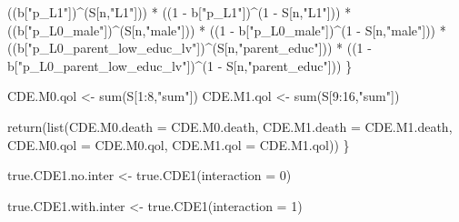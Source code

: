 \documentclass[
]{book}
\newenvironment{Shaded}{\begin{snugshade}}{\end{snugshade}}
\newcommand{\AttributeTok}[1]{\textcolor[rgb]{0.77,0.63,0.00}{#1}}
\newcommand{\DecValTok}[1]{\textcolor[rgb]{0.00,0.00,0.81}{#1}}
\newcommand{\FunctionTok}[1]{\textcolor[rgb]{0.00,0.00,0.00}{#1}}
\newcommand{\NormalTok}[1]{#1}
\newcommand{\OtherTok}[1]{\textcolor[rgb]{0.56,0.35,0.01}{#1}}
\newcommand{\SpecialCharTok}[1]{\textcolor[rgb]{0.00,0.00,0.00}{#1}}
\newcommand{\StringTok}[1]{\textcolor[rgb]{0.31,0.60,0.02}{#1}}
\begin{document}
\begin{Shaded}
\begin{Highlighting}[]
\NormalTok{      ((b[}\StringTok{"p\_L1"}\NormalTok{])}\SpecialCharTok{\^{}}\NormalTok{(S[n,}\StringTok{"L1"}\NormalTok{])) }\SpecialCharTok{*}
\NormalTok{      ((}\DecValTok{1} \SpecialCharTok{{-}}\NormalTok{ b[}\StringTok{"p\_L1"}\NormalTok{])}\SpecialCharTok{\^{}}\NormalTok{(}\DecValTok{1} \SpecialCharTok{{-}}\NormalTok{ S[n,}\StringTok{"L1"}\NormalTok{])) }\SpecialCharTok{*}
\NormalTok{      ((b[}\StringTok{"p\_L0\_male"}\NormalTok{])}\SpecialCharTok{\^{}}\NormalTok{(S[n,}\StringTok{"male"}\NormalTok{])) }\SpecialCharTok{*} 
\NormalTok{      ((}\DecValTok{1} \SpecialCharTok{{-}}\NormalTok{ b[}\StringTok{"p\_L0\_male"}\NormalTok{])}\SpecialCharTok{\^{}}\NormalTok{(}\DecValTok{1} \SpecialCharTok{{-}}\NormalTok{ S[n,}\StringTok{"male"}\NormalTok{])) }\SpecialCharTok{*} 
\NormalTok{      ((b[}\StringTok{"p\_L0\_parent\_low\_educ\_lv"}\NormalTok{])}\SpecialCharTok{\^{}}\NormalTok{(S[n,}\StringTok{"parent\_educ"}\NormalTok{])) }\SpecialCharTok{*}
\NormalTok{      ((}\DecValTok{1} \SpecialCharTok{{-}}\NormalTok{ b[}\StringTok{"p\_L0\_parent\_low\_educ\_lv"}\NormalTok{])}\SpecialCharTok{\^{}}\NormalTok{(}\DecValTok{1} \SpecialCharTok{{-}}\NormalTok{ S[n,}\StringTok{"parent\_educ"}\NormalTok{])) }
\NormalTok{    \}}
  
\NormalTok{  CDE.M0.qol }\OtherTok{\textless{}{-}} \FunctionTok{sum}\NormalTok{(S[}\DecValTok{1}\SpecialCharTok{:}\DecValTok{8}\NormalTok{,}\StringTok{"sum"}\NormalTok{])}
\NormalTok{  CDE.M1.qol }\OtherTok{\textless{}{-}} \FunctionTok{sum}\NormalTok{(S[}\DecValTok{9}\SpecialCharTok{:}\DecValTok{16}\NormalTok{,}\StringTok{"sum"}\NormalTok{])}
  
  \FunctionTok{return}\NormalTok{(}\FunctionTok{list}\NormalTok{(}\AttributeTok{CDE.M0.death =}\NormalTok{ CDE.M0.death, }\AttributeTok{CDE.M1.death =}\NormalTok{ CDE.M1.death, }
              \AttributeTok{CDE.M0.qol =}\NormalTok{ CDE.M0.qol, }\AttributeTok{CDE.M1.qol =}\NormalTok{ CDE.M1.qol))}
\NormalTok{\}}
\end{Highlighting}
\end{Shaded}

\begin{Shaded}
\begin{Highlighting}[]
\NormalTok{true.CDE1.no.inter }\OtherTok{\textless{}{-}} \FunctionTok{true.CDE1}\NormalTok{(}\AttributeTok{interaction =} \DecValTok{0}\NormalTok{)}

\NormalTok{true.CDE1.with.inter }\OtherTok{\textless{}{-}} \FunctionTok{true.CDE1}\NormalTok{(}\AttributeTok{interaction =} \DecValTok{1}\NormalTok{)}
\end{Highlighting}
\end{Shaded}
\end{document}

